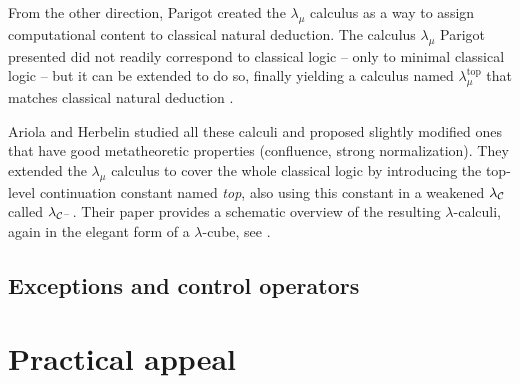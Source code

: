 From the other direction, Parigot created the $\lambda_\mu$ calculus \cite{parigot92}
as a way to assign computational content to classical natural deduction. The calculus
$\lambda_\mu$ Parigot presented did not readily correspond to classical logic --
only to minimal classical logic -- but it can be extended to do so, finally yielding
a calculus named $\lambda_\mu^\mathrm{top}$ that matches classical natural deduction
\cite{ariola-herbelin}.

Ariola and Herbelin studied all these calculi and proposed
slightly modified ones that have good metatheoretic properties (confluence, strong
normalization). They extended the $\lambda_\mu$ calculus to cover the whole classical
logic by introducing the top-level continuation constant named \emph{top}, also using this constant
in a weakened $\lambda_{\mathcal{C}}$ called $\lambda_{\mathcal{C}^-}$.
Their paper provides a schematic overview of the resulting $\lambda$-calculi, again in the
elegant form of a $\lambda$-cube, see .

\subsection{Exceptions and control operators}




\section{Practical appeal}


\label{chap:dependent-types}






































































